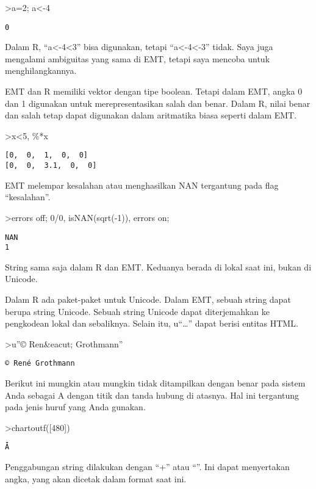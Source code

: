 \documentclass[
]{book}
\begin{document}
\textgreater a=2; a\textless-4

\begin{verbatim}
0
\end{verbatim}

Dalam R, ``a\textless-4\textless3'' bisa digunakan, tetapi ``a\textless-4\textless-3'' tidak. Saya juga mengalami ambiguitas yang sama di EMT, tetapi saya mencoba untuk menghilangkannya.

EMT dan R memiliki vektor dengan tipe boolean. Tetapi dalam EMT, angka 0 dan 1 digunakan untuk merepresentasikan salah dan benar. Dalam R, nilai benar dan salah tetap dapat digunakan dalam aritmatika biasa seperti dalam EMT.

\textgreater x\textless5, \%*x

\begin{verbatim}
[0,  0,  1,  0,  0]
[0,  0,  3.1,  0,  0]
\end{verbatim}

EMT melempar kesalahan atau menghasilkan NAN tergantung pada flag ``kesalahan''.

\textgreater errors off; 0/0, isNAN(sqrt(-1)), errors on;

\begin{verbatim}
NAN
1
\end{verbatim}

String sama saja dalam R dan EMT. Keduanya berada di lokal saat ini, bukan di Unicode.

Dalam R ada paket-paket untuk Unicode. Dalam EMT, sebuah string dapat berupa string Unicode. Sebuah string Unicode dapat diterjemahkan ke pengkodean lokal dan sebaliknya. Selain itu, u``\ldots'' dapat berisi entitas HTML.

\textgreater u''© Ren\&eacut; Grothmann''

\begin{verbatim}
© René Grothmann
\end{verbatim}

Berikut ini mungkin atau mungkin tidak ditampilkan dengan benar pada sistem Anda sebagai A dengan titik dan tanda hubung di atasnya. Hal ini tergantung pada jenis huruf yang Anda gunakan.

\textgreater chartoutf({[}480{]})

\begin{verbatim}
Ǡ
\end{verbatim}

Penggabungan string dilakukan dengan ``+'' atau ``\textbar{}''. Ini dapat menyertakan angka, yang akan dicetak dalam format saat ini.
\end{document}
